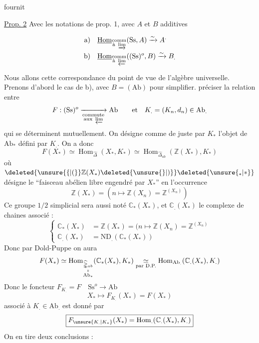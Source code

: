 fournit 

\uline{Prop. 2} Avec les notations  de prop. 1, avec $A$ et $B$ additives 

\[
\begin{aligned}
\text{a)}\quad&\underline{\operatorname{Hom}}_{\substack{\text{comm}\\\text{à }\varinjlim}}(\mathrm{Ss},A)\xrightarrow{\sim} A^{.}\\
\text{b)}\quad&\underline{\operatorname{Hom}}_{\substack{\text{comm}\\\text{à }\varprojlim}}((\mathrm{Ss})^o,B)\xrightarrow{\sim} B_{.}
\end{aligned}
\]

Nous allons  cette correspondance du point de vue de l'algèbre universelle. Prenons d'abord le cas de b), avec $B=(\mathrm{Ab})$ pour simplifier.  préciser la relation entre
\[
F:(\mathrm{Ss})^o\xrightarrow[\substack{\text{commute}\\\text{aux }\varprojlim}]{}\mathrm{Ab} \qquad\text{et}\quad K_{.}=(K_n,d_n)\in \mathrm{Ab}_{.}
\]
qui se déterminent mutuellement. On désigne comme de juste par $K_*$ l'objet de $\mathrm{Ab}_*$ défini par $K_{.}$. On a donc
\[
F(X_*)\simeq\operatorname{Hom}_{\widehat{\mathbb{\Delta}}}(X_*,K_*)\simeq\operatorname{Hom}_{\widehat{\mathbb{\Delta}}_{ab}}(\mathbb{Z}(X_*),K_*)
\]
où $\deleted{\unsure{\{|(}}\mathbb{Z}(X_*)\deleted{\unsure{\}|)}}\deleted{\unsure{{}_*|*}}$ désigne le ``faisceau abélien libre engendré par $X_*$'' en l'occurrence
\[
\mathbb{Z}(X_*)=(n\longmapsto\mathbb{Z}(X_n)=\mathbb{Z}^{(X_n)})
\]
Ce groupe  $1/2$ simplicial sera aussi noté $\mathbb{C}_*(X_*)$, et $\mathbb{C}_{.}(X_*)$ le complexe de chaines associé  : 
\[
\left\{\begin{aligned}
\mathbb{C}_*(X_*)&=\mathbb{Z}(X_*)=(n\longmapsto\mathbb{Z}(X_n)=\mathbb{Z}^{(X_n)}\\
\mathbb{C}_{.}(X_*)&=\mathrm{ND}_{.}(\mathbb{C}_*(X_*))
\end{aligned}\right.
\]
Donc par Dold-Puppe on aura
\[
F(X_*)\simeq\operatorname{Hom}_{\substack{\widehat{\mathbb{\Delta}}_{ab}\\\shortparallel\\\mathrm{Ab}_*}}(\mathbb{C}_*(X_*),K_*)\underset{\text{par D.P.}}{\simeq}\operatorname{Hom}_{\mathrm{Ab}_{.}}(\mathbb{C}_{.}(X_*),K_{.})
\]
Donc le foncteur $F_{K_{.}}=F\quad \mathrm{Ss}^o\longrightarrow \mathrm{Ab}$
\[
X_*\longmapsto F_{K_{.}}(X_*)=F(X_*)
\]
associé à $K_{.}\in \mathrm{Ab}_{.}$ est donné par
\[
\boxed{F_{\unsure{K_{.}|K_*}}(X_*)=\operatorname{Hom}_{.}(\mathbb{C}_{.}(X_*),K_{.})}
\]
On en tire deux conclusions :

